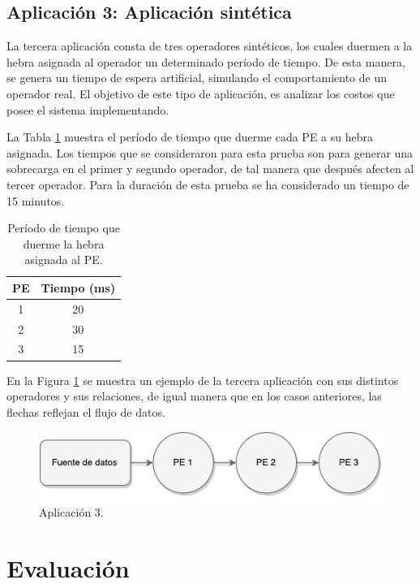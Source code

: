 \subsection{Aplicación 3: Aplicación sintética}
La tercera aplicación consta de tres operadores sintéticos, los cuales duermen a la hebra asignada al operador un determinado período de tiempo. De esta manera, se genera un tiempo de espera artificial, simulando el comportamiento de un operador real. El objetivo de este tipo de aplicación, es analizar los costos que posee el sistema implementando.

La Tabla \ref{tab:app3-time} muestra el período de tiempo que duerme cada PE a su hebra asignada. Los tiempos que se consideraron para esta prueba son para generar una sobrecarga en el primer y segundo operador, de tal manera que después afecten al tercer operador. Para la duración de esta prueba se ha considerado un tiempo de 15 minutos.

\begin{table}[!ht]
\centering
\caption{Período de tiempo que duerme la hebra asignada al PE.}
\begin{tabular}{| c | c |}
\hline
PE & Tiempo (ms) \\ \hline
1 & 20 \\
2 & 30 \\
3 & 15 \\\hline
\end{tabular}
\label{tab:app3-time}
\end{table}

En la Figura \ref{fig:terceraAplicacion} se muestra un ejemplo de la tercera aplicación con sus distintos operadores y sus relaciones, de igual manera que en los casos anteriores, las flechas reflejan el flujo de datos.

\begin{figure}[!hb]
	\centering
		\includegraphics[scale=0.75]{images/App3.pdf}
	\caption{Aplicación 3.}
	\label{fig:terceraAplicacion}
\end{figure}

\section{Evaluación}

